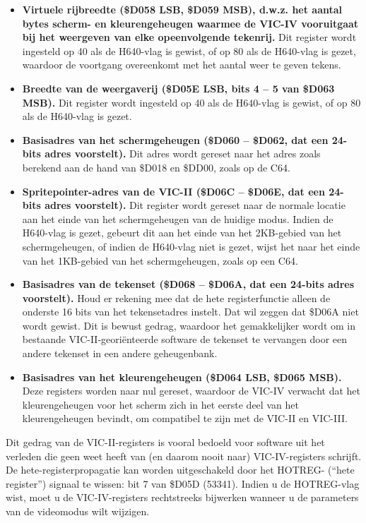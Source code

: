 \begin{itemize}
\$D011.\item {\bf Virtuele rijbreedte (\$D058 LSB, \$D059 MSB), d.w.z. het aantal bytes scherm- en kleurengeheugen waarmee de VIC-IV vooruitgaat bij het weergeven van elke opeenvolgende tekenrij.} Dit register wordt ingesteld op 40 als de H640-vlag is gewist, of op 80 als de H640-vlag is gezet, waardoor de voortgang overeenkomt met het aantal weer te geven tekens.\item {\bf Breedte van de weergaverij (\$D05E LSB, bits 4 -- 5 van \$D063 MSB).} Dit register wordt ingesteld op 40 als de H640-vlag is gewist, of op 80 als de H640-vlag is gezet.\item {\bf Basisadres van het schermgeheugen (\$D060 -- \$D062, dat een 24-bits adres voorstelt).}  Dit adres wordt gereset naar het adres zoals berekend aan de hand van \$D018 en \$DD00, zoals op de C64.\item {\bf Spritepointer-adres van de VIC-II (\$D06C -- \$D06E, dat een 24-bits adres voorstelt).} Dit register wordt gereset naar de normale locatie aan het einde van het schermgeheugen van de huidige modus.  Indien de H640-vlag is gezet, gebeurt dit aan het einde van het 2KB-gebied van het schermgeheugen, of indien de H640-vlag niet is gezet, wijst het naar het einde van het 1KB-gebied van het schermgeheugen, zoals op een C64.\item {\bf Basisadres van de tekenset (\$D068 -- \$D06A, dat een 24-bits adres voorstelt).}  Houd er rekening mee dat de hete registerfunctie alleen de onderste 16 bits van het tekensetadres instelt. Dat wil zeggen dat \$D06A niet wordt gewist. Dit is bewust gedrag, waardoor het gemakkelijker wordt om in bestaande VIC-II-georiënteerde software de tekenset te vervangen door een andere tekenset in een andere geheugenbank.\item {\bf Basisadres van het kleurengeheugen (\$D064 LSB, \$D065 MSB).} Deze registers worden naar nul gereset, waardoor de VIC-IV verwacht dat het kleurengeheugen voor het scherm zich in het eerste deel van het kleurengeheugen bevindt, om compatibel te zijn met de VIC-II en VIC-III.
\end{itemize}

Dit gedrag van de VIC-II-registers is vooral bedoeld voor software uit het verleden die geen weet heeft van (en daarom nooit naar) VIC-IV-registers schrijft. De hete-registerpropagatie kan worden uitgeschakeld door het HOTREG- (``hete register'') signaal te wissen: bit 7 van \$D05D (53341). Indien u de HOTREG-vlag wist, moet u de VIC-IV-registers rechtstreeks bijwerken wanneer u de parameters van de videomodus wilt wijzigen.

